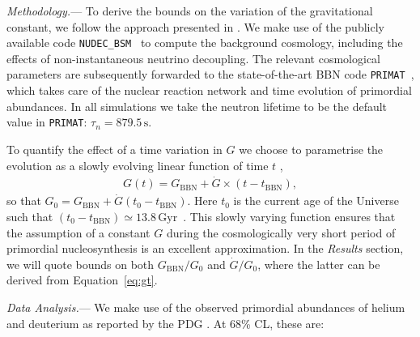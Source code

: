 \documentclass[notitlepage,twocolumn,letterpaper,natbib,aps,prl,amsmath,amsfonts,nofootinbib,preprintnumbers,superscriptaddress,secnumarabic,groupedaddress]{revtex4-1}
\begin{document}

\emph{Methodology.}--- To derive the bounds on the variation of the gravitational constant, we follow the approach presented in \cite{Sabti:2019mhn}. We make use of the publicly available code \texttt{NUDEC\_BSM}~\cite{Escudero:2018mvt, Escudero:2019new} to compute the background cosmology, including the effects of non-instantaneous neutrino decoupling. The relevant cosmological parameters are subsequently forwarded to the state-of-the-art BBN code \texttt{PRIMAT}~\cite{Pitrou:2018cgg}, which takes care of the nuclear reaction network and time evolution of primordial abundances. In all simulations we take the neutron lifetime to be the default value in \texttt{PRIMAT}: $\tau_n = 879.5 \, \mathrm{s}$.
\setlength\parskip{0pt}

To quantify the effect of a time variation in $G$ we choose to parametrise the evolution as a slowly evolving linear function of time $t$ \cite{Uzan:2002vq},
\begin{align}
    G(t) = G_{\mathrm{BBN}} + \dot{G} \times (t - t_{\mathrm{BBN}}), \label{eq:gt}
\end{align}
so that $G_0 = G_{\mathrm{BBN}} + \dot{G}(t_0 - t_{\mathrm{BBN}})$. Here $t_0$ is the current age of the Universe such that $(t_0 - t_{\mathrm{BBN}}) \simeq 13.8\, \mathrm{Gyr}$~\cite{Aghanim:2018eyx}. This slowly varying function ensures that the assumption of a constant $G$ during the cosmologically very short period of primordial nucleosynthesis is an excellent approximation. In the \emph{Results} section, we will quote bounds on both $G_{\mathrm{BBN}}/G_0$ and $\dot{G}/G_0$, where the latter can be derived from Equation~\eqref{eq:gt}.
\setlength\parskip{10pt}
\newpage

\emph{Data Analysis.}--- We make use of the observed primordial abundances of helium and deuterium as reported by the PDG \cite{pdg}. At 68\% CL, these are:
\end{document}
